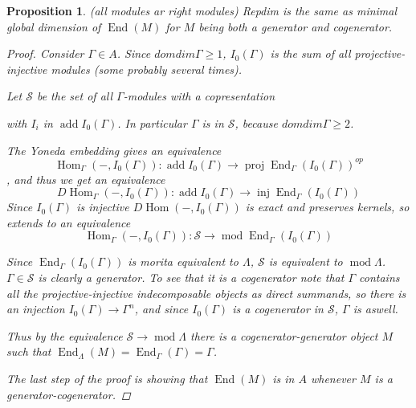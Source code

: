 \documentclass[11pt, a4paper, english]{article}
\newtheorem{prop}[theorem]{Proposition}
\theoremstyle{definition}
\DeclareMathOperator{\Hom}{Hom}
\DeclareMathOperator{\End}{End}
\DeclareMathOperator{\inj}{inj}
\DeclareMathOperator{\proj}{proj}
\DeclareMathOperator{\add}{add}
\def\mod{\operatorname{mod}}
\begin{document}
\begin{prop}
	(all modules ar right modules)
	Repdim is the same as minimal global dimension of $\End(M)$ for $M$ being both a generator and cogenerator. 
	\begin{proof}
		Consider $\Gamma \in A$. Since $domdim\Gamma \geq 1$, $I_0(\Gamma)$ is the sum of all projective-injective modules (some probably several times). 
		
		Let $\mathcal S$ be the set of all $\Gamma$-modules with a copresentation
		\begin{center}
		\end{center}
		with $I_i$ in $\add I_0(\Gamma)$. In particular $\Gamma$ is in $\mathcal S$, because $domdim\Gamma \geq 2$.
		
		The Yoneda embedding gives an equivalence $$\Hom_\Gamma(-,I_0(\Gamma)):\add I_0(\Gamma) \to \proj\End_\Gamma(I_0(\Gamma))^{op}$$, and thus we get an equivalence $$D\Hom_\Gamma(-,I_0(\Gamma)):\add I_0(\Gamma) \to \inj\End_\Gamma(I_0(\Gamma))$$
		Since $I_0(\Gamma)$ is injective $D\Hom(-,I_0(\Gamma))$ is exact and preserves kernels, so extends to an equivalence
		$$\Hom_\Gamma(-,I_0(\Gamma)):\mathcal S \to \mod \End_\Gamma(I_0(\Gamma))$$
		
		Since $\End_\Gamma(I_0(\Gamma))$ is morita equivalent to $\Lambda$, $\mathcal S$ is equivalent to $\mod \Lambda$. $\Gamma \in \mathcal S$ is clearly a generator. To see that it is a cogenerator note that $\Gamma$ contains all the projective-injective indecomposable objects as direct summands, so there is an injection $I_0(\Gamma) \to \Gamma^n$, and since $I_0(\Gamma)$ is a cogenerator in $\mathcal S$, $\Gamma$ is aswell.
		
		Thus by the equivalence $\mathcal S \to \mod\Lambda$ there is a cogenerator-generator object $M$ such that $\End_\Lambda(M) = \End_\Gamma(\Gamma)=\Gamma$.
		
		The last step of the proof is showing that $\End(M)$ is in $A$ whenever $M$ is a generator-cogenerator.
		

\end{proof}
\end{prop}
\end{document}
